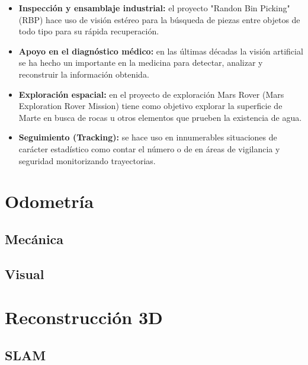 \begin{itemize}
  \item \textbf{Inspección y ensamblaje industrial:} el proyecto "Randon Bin
  Picking" (RBP) hace uso de visión estéreo para la búsqueda de piezas entre
  objetos de todo tipo para su rápida recuperación.
  \item \textbf{Apoyo en el diagnóstico médico:} en las últimas décadas la
  visión artificial se ha hecho un importante en la medicina para detectar,
  analizar y reconstruir la información obtenida.
  \item \textbf{Exploración espacial:} en el proyecto de exploración Mars Rover
  (Mars Exploration Rover Mission) tiene como objetivo explorar la superficie
  de Marte en busca de rocas u otros elementos que prueben la existencia de
  agua.
  \item \textbf{Seguimiento (Tracking):} se hace uso en innumerables situaciones
  de carácter estadístico como contar el número o de en áreas de vigilancia y
  seguridad monitorizando trayectorias.
\end{itemize}


\section{Odometría}
\label{2:sec:3}

\subsection{Mecánica}

\subsection{Visual}


\section{Reconstrucción 3D}
\label{2:sec:4}





\subsection{SLAM}










